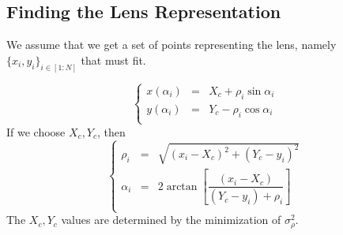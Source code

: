 \documentclass[aps,onecolumn]{revtex4}
\begin{document}
\subsection{Finding the Lens Representation}
We assume that we get a set of points representing the lens, namely $\lbrace x_i,y_i \rbrace_{i\in[1:N]}$ that must
fit.

\begin{equation}
	\left\lbrace
		\begin{array}{rcl}
	x(\alpha_i) & = & X_c + \rho_i\sin\alpha_i\\
	y(\alpha_i) & = & Y_c - \rho_i\cos\alpha_i\\
		\end{array}
	\right.
\end{equation}
If we choose $X_c,Y_c$, then
\begin{equation}
	\left\lbrace
	\begin{array}{rcl}	
	\rho_i   &=&\sqrt{\left(x_i-X_c\right)^2+\left(Y_c-y_i\right)^2}\\
	\alpha_i &=& 2 \arctan\left[ \dfrac{\left(x_i-X_c\right)}{\left(Y_c-y_i\right)+\rho_i}\right]\\
	\end{array}
	\right.
\end{equation}
The $X_c,Y_c$ values are determined by the minimization of $\sigma^2_\rho$.
\end{document}
